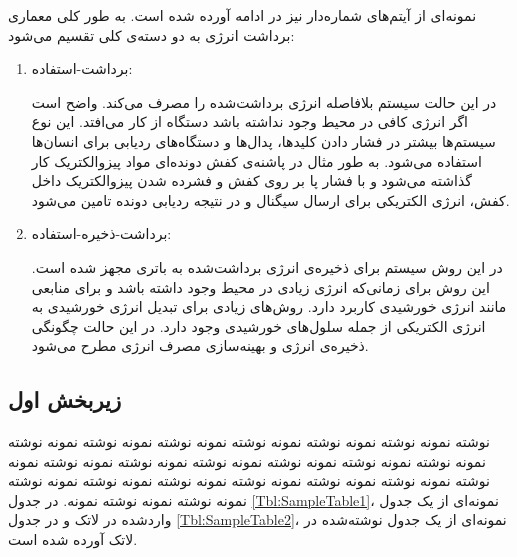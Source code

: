 نمونه‌ای از آیتم‌های شماره‌دار نیز در ادامه آورده شده است. به طور کلی معماری برداشت انرژی به دو دسته‌ی کلی تقسیم می‌شود:
\begin{enumerate}[label=\arabic*)]
\item
برداشت-استفاده:

در این حالت سیستم بلافاصله انرژی برداشت‌شده را مصرف می‌کند. واضح است اگر انرژی کافی در محیط وجود نداشته باشد دستگاه از کار می‌افتد. این نوع سیستم‌ها بیشتر در فشار دادن کلید‌ها، پدال‌ها و دستگاه‌های ردیابی برای انسان‌ها استفاده می‌شود. به طور مثال در پاشنه‌ی کفش دونده‌ای مواد پیزوالکتریک کار گذاشته می‌شود و با فشار پا بر روی کفش و فشرده شدن پیزوالکتریک داخل کفش، انرژی الکتریکی برای ارسال سیگنال 
و در نتیجه ردیابی دونده تامین می‌شود. 
\item
برداشت-ذخیره-استفاده:

در این روش سیستم برای ذخیره‌ی انرژی برداشت‌شده به باتری مجهز شده است. این روش برای زمانی‌که انرژی زیادی در محیط وجود داشته باشد و برای منابعی مانند انرژی خورشیدی  کاربرد دارد. روش‌های زیادی برای تبدیل انرژی خورشیدی به انرژی الکتریکی از جمله سلول‌های خورشیدی وجود دارد. در این حالت چگونگی ذخیره‌ی انرژی و بهینه‌سازی مصرف انرژی مطرح می‌شود.
\end{enumerate}




\subsection{زیربخش اول}
نوشته نمونه نوشته نمونه نوشته نمونه نوشته نمونه نوشته نمونه نوشته نمونه نوشته نمونه نوشته نمونه نوشته نمونه نوشته نمونه نوشته نمونه نوشته نمونه نوشته نمونه نوشته نمونه نوشته نمونه نوشته نمونه نوشته نمونه نوشته نمونه نوشته نمونه نوشته نمونه نوشته نمونه نوشته نمونه. در جدول
\ref{Tbl:SampleTable1}،
نمونه‌ای از یک جدول واردشده در لاتک و در جدول
\ref{Tbl:SampleTable2}،
نمونه‌ای از یک جدول نوشته‌شده در لاتک آورده شده است.

